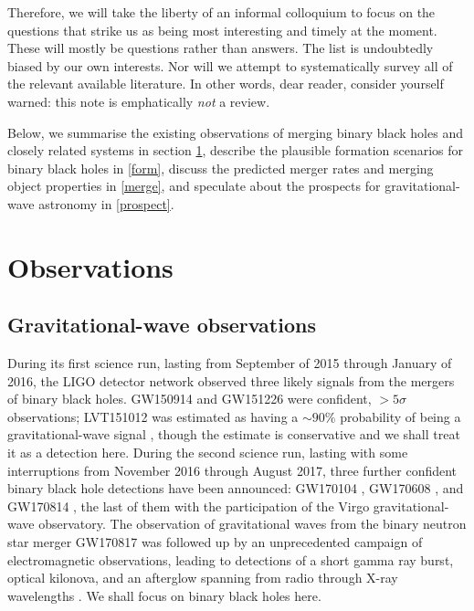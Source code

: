 \documentclass[iop,onecolumn]{revtex4}
\begin{document}
Therefore, we will take the liberty of an informal colloquium to focus on the questions that strike us as being most interesting and timely at the moment.  These will mostly be questions rather than answers.  The list is undoubtedly biased by our own interests.  Nor will we attempt to systematically survey all of the relevant available literature.  In other words, dear reader, consider yourself warned: this note is emphatically {\it not} a review.

Below, we summarise the existing observations of merging binary black holes and closely related systems in section \ref{obs}, describe the plausible formation scenarios for binary black holes in \autoref{form}, discuss the predicted merger rates and merging object properties in \autoref{merge}, and speculate about the prospects for gravitational-wave astronomy in \autoref{prospect}.


 

\section{Observations}\label{obs}

\subsection{Gravitational-wave observations}

During its first science run, lasting from September of 2015 through January of 2016, the LIGO detector network observed three likely signals from the mergers of binary black holes.  GW150914 \citep{GW150914} and GW151226 \citep{GW151226} were confident, $> 5\sigma$ observations; LVT151012 was estimated as having a $\sim 90\%$ probability of being a gravitational-wave signal \citep{GW150914:rates,BBH:O1}, though the estimate is conservative and we shall treat it as a detection here.  During the second science run, lasting with some interruptions from November 2016 through August 2017, three further confident binary black hole detections have been announced: GW170104 \citep{GW170104},  GW170608 \citep{GW170608}, and GW170814 \citep{GW170814}, the last of them with the participation of the Virgo gravitational-wave observatory.   The observation of gravitational waves from the binary neutron star merger GW170817 \citep{GW170817} was followed up by an unprecedented campaign of electromagnetic observations, leading to detections of a short gamma ray burst, optical kilonova, and an afterglow spanning from radio through X-ray wavelengths \citep{GW170817:GRB,GW170817:MMA}.  We shall focus on binary black holes here.
\end{document}
